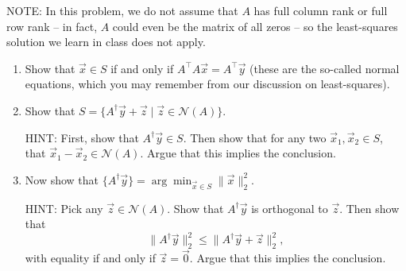 \documentclass[
  12pt,
]{fphw}
\begin{document}
NOTE: In this problem, we do not assume that $A$ has full column rank or full row rank -- in fact, $A$ could even
be the matrix of all zeros -- so the least-squares solution we learn in class does not apply.

\begin{enumerate}
\item[(c)] Show that $\vec x \in S$ if and only if $A^\top A \vec x = A^\top \vec y$ (these are the so-called normal equations, which you may
remember from our discussion on least-squares).

\item[(d)] Show that $S = \{A^\dagger \vec y + \vec z \mid \vec z \in \mathcal{N}(A)\}$.

HINT: First, show that $A^\dagger \vec y \in S$. Then show that for any two $\vec x_1, \vec x_2 \in S$, that $\vec x_1 - \vec x_2 \in \mathcal{N}(A)$. Argue
that this implies the conclusion.

\item[(e)] Now show that $\{A^\dagger \vec y\} = \arg\min_{\vec x\in S} \|\vec x\|_2^2$.

HINT: Pick any $\vec z \in \mathcal{N}(A)$. Show that $A^\dagger \vec y$ is orthogonal to $\vec z$. Then show that
\[
\|A^\dagger \vec y\|_2^2 \le \|A^\dagger \vec y + \vec z\|_2^2,
\]
with equality if and only if $\vec z = \vec 0$. Argue that this implies the conclusion.
\end{enumerate}
\end{document}
